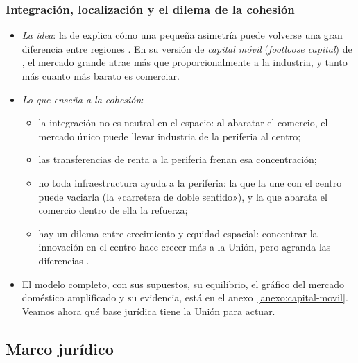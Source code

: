 \documentclass[11pt]{article}
\begin{document}
\subsubsection{Integración, localización y el dilema de la cohesión}\label{sec:modelo-localizacion}

\begin{itemize}
\item \emph{La idea}: la  de \textcite{Krugman1991Increasing} explica cómo una pequeña asimetría puede volverse una gran diferencia entre regiones  . En su versión de \emph{capital móvil} (\emph{footloose capital}) de \textcite{MartinRogers1995}, el mercado grande atrae más que proporcionalmente a la industria, y tanto más cuanto más barato es comerciar\nocite{BaldwinEtAl2003Economic}.
\item \emph{Lo que enseña a la cohesión}:
  \begin{itemize}
  \item la integración no es neutral en el espacio: al abaratar el comercio, el mercado único puede llevar industria de la periferia al centro;
  \item las transferencias de renta a la periferia frenan esa concentración;
  \item no toda infraestructura ayuda a la periferia: la que la une con el centro puede vaciarla (la «carretera de doble sentido»), y la que abarata el comercio dentro de ella la refuerza;
  \item hay un dilema entre crecimiento y equidad espacial: concentrar la innovación en el centro hace crecer más a la Unión, pero agranda las diferencias \parencite{Martin1999}.
  \end{itemize}
\item El modelo completo, con sus supuestos, su equilibrio, el gráfico del mercado doméstico amplificado y su evidencia, está en el anexo~\ref{anexo:capital-movil}. Veamos ahora qué base jurídica tiene la Unión para actuar.
\end{itemize}

\subsection{Marco jurídico}\label{sec:marco-regional}
\end{document}
